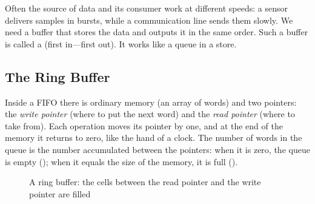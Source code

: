 Often the source of data and its consumer work at different speeds: a sensor
delivers samples in bursts, while a communication line sends them slowly. We
need a buffer that stores the data and outputs it in the same order. Such a
buffer is called a  (first in---first out). It works like a queue
in a store.

\subsection{The Ring Buffer}

Inside a FIFO there is ordinary memory (an array of words) and two pointers:
the \emph{write pointer} (where to put the next word) and the \emph{read
pointer} (where to take from). Each operation moves its pointer by one, and at
the end of the memory it returns to zero, like the hand of a clock. The number
of words in the queue is the number accumulated between the pointers: when it
is zero, the queue is empty (); when it equals the size of the
memory, it is full ().

\begin{figure}[H]
\centering
{}
\caption{A ring buffer: the cells between the read pointer  and the write pointer  are filled}
\end{figure}

